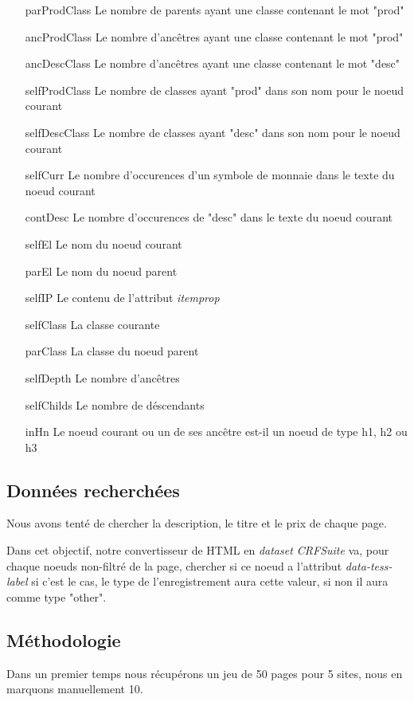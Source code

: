 \documentclass{article}
\begin{document}
\begin{itemize}
    \item[parProdClass] Le nombre de parents ayant une classe contenant le mot "prod"
    \item[ancProdClass] Le nombre d'ancêtres ayant une classe contenant le mot "prod"
    \item[ancDescClass] Le nombre d'ancêtres ayant une classe contenant le mot "desc"
    \item[selfProdClass] Le nombre de classes ayant "prod" dans son nom pour le noeud courant
    \item[selfDescClass] Le nombre de classes ayant "desc" dans son nom pour le noeud courant
    \item[selfCurr] Le nombre d'occurences d'un symbole de monnaie dans le texte du noeud courant
    \item[contDesc] Le nombre d'occurences de "desc" dans le texte du noeud courant
    \item[selfEl] Le nom du noeud courant
    \item[parEl] Le nom du noeud parent
    \item[selfIP] Le contenu de l'attribut \emph{itemprop}
    \item[selfClass] La classe courante
    \item[parClass] La classe du noeud parent
    \item[selfDepth] Le nombre d'ancêtres
    \item[selfChilds] Le nombre de déscendants
    \item[inHn] Le noeud courant ou un de ses ancêtre est-il un noeud de type h1, h2 ou h3
\end{itemize}

\subsection{Données recherchées}
Nous avons tenté de chercher la description, le titre et le prix de chaque page.

Dans cet objectif, notre convertisseur de HTML en \emph{dataset CRFSuite} va, pour chaque
noeuds non-filtré de la page, chercher si ce noeud a l'attribut \emph{data-tess-label}
si c'est le cas, le type de l'enregistrement aura cette valeur, si non il aura comme
type "other".

\subsection{Méthodologie}
Dans un premier temps nous récupérons un jeu de 50 pages pour 5 sites, nous en
marquons manuellement 10.
\end{document}
